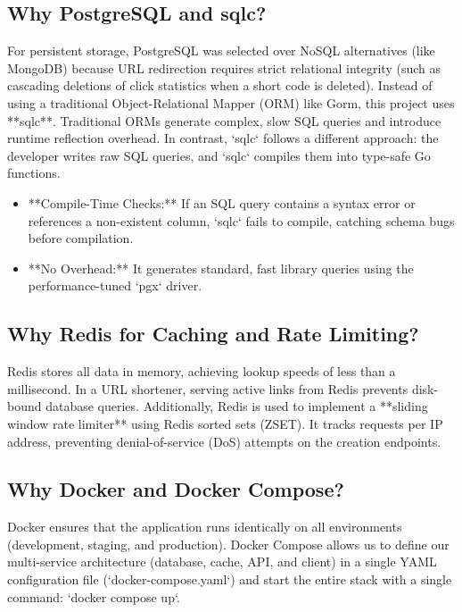 \subsection{Why PostgreSQL and sqlc?}
For persistent storage, PostgreSQL was selected over NoSQL alternatives (like MongoDB) because URL redirection requires strict relational integrity (such as cascading deletions of click statistics when a short code is deleted).
Instead of using a traditional Object-Relational Mapper (ORM) like Gorm, this project uses **sqlc**. Traditional ORMs generate complex, slow SQL queries and introduce runtime reflection overhead. In contrast, `sqlc` follows a different approach: the developer writes raw SQL queries, and `sqlc` compiles them into type-safe Go functions. 
\begin{itemize}
    \item **Compile-Time Checks:** If an SQL query contains a syntax error or references a non-existent column, `sqlc` fails to compile, catching schema bugs before compilation.
    \item **No Overhead:** It generates standard, fast library queries using the performance-tuned `pgx` driver.
\end{itemize}

\subsection{Why Redis for Caching and Rate Limiting?}
Redis stores all data in memory, achieving lookup speeds of less than a millisecond. In a URL shortener, serving active links from Redis prevents disk-bound database queries. 
Additionally, Redis is used to implement a **sliding window rate limiter** using Redis sorted sets (ZSET). It tracks requests per IP address, preventing denial-of-service (DoS) attempts on the creation endpoints.

\subsection{Why Docker and Docker Compose?}
Docker ensures that the application runs identically on all environments (development, staging, and production). Docker Compose allows us to define our multi-service architecture (database, cache, API, and client) in a single YAML configuration file (`docker-compose.yaml`) and start the entire stack with a single command: `docker compose up`.

